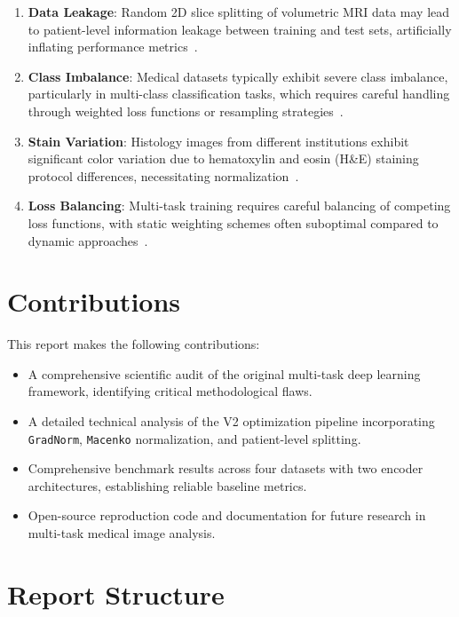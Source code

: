 \documentclass[11pt,a4paper,twoside]{report}
\newcommand{\model}[1]{\texttt{#1}}
\begin{document}
\begin{enumerate}
    \item \textbf{Data Leakage}: Random 2D slice splitting of volumetric MRI data may lead to patient-level information leakage between training and test sets, artificially inflating performance metrics~\cite{miller2019dataleakage}.
    \item \textbf{Class Imbalance}: Medical datasets typically exhibit severe class imbalance, particularly in multi-class classification tasks, which requires careful handling through weighted loss functions or resampling strategies~\cite{fakoor2023class}.
    \item \textbf{Stain Variation}: Histology images from different institutions exhibit significant color variation due to hematoxylin and eosin (H\&E) staining protocol differences, necessitating normalization~\cite{macenko2009stain}.
    \item \textbf{Loss Balancing}: Multi-task training requires careful balancing of competing loss functions, with static weighting schemes often suboptimal compared to dynamic approaches~\cite{ding2024gradnorm}.
\end{enumerate}

\section{Contributions}

This report makes the following contributions:

\begin{itemize}
    \item A comprehensive scientific audit of the original multi-task deep learning framework, identifying critical methodological flaws.
    \item A detailed technical analysis of the V2 optimization pipeline incorporating \model{GradNorm}, \model{Macenko} normalization, and patient-level splitting.
    \item Comprehensive benchmark results across four datasets with two encoder architectures, establishing reliable baseline metrics.
    \item Open-source reproduction code and documentation for future research in multi-task medical image analysis.
\end{itemize}

\section{Report Structure}
\end{document}
